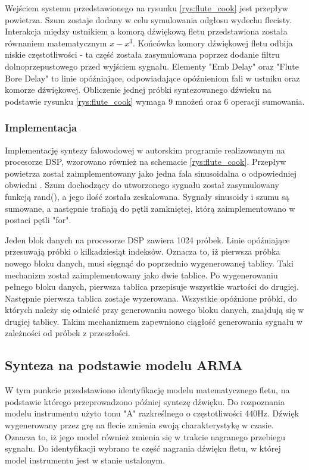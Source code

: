 Wejściem systemu przedstawionego na rysunku \ref{rys:flute_cook} jest przepływ powietrza. Szum zostaje dodany w celu symulowania odgłosu wydechu flecisty. 
Interakcja między ustnikiem a komorą dźwiękową fletu przedstawiona została równaniem matematycznym $x-x^3$. Końcówka komory dźwiękowej fletu odbija niskie częstotliwości - ta część została zasymulowana poprzez dodanie filtru dolnoprzepustowego przed wyjściem sygnału. Elementy "Emb Delay" oraz "Flute Bore Delay" to linie opóźniające, odpowiadające opóźnieniom fali w ustniku oraz komorze dźwiękowej. 
Obliczenie jednej próbki syntezowanego dźwieku na podstawie rysunku \ref{rys:flute_cook} wymaga 9 mnożeń oraz 6 operacji sumowania.

\subsubsection{Implementacja}
Implementację syntezy falowodowej w autorskim programie realizowanym na procesorze DSP,  wzorowano również na schemacie \ref{rys:flute_cook}. Przepływ powietrza został zaimplementowany jako jedna fala sinusoidalna o odpowiedniej obwiedni \cite{flute_prezka}. Szum dochodzący do utworzonego sygnału został zasymulowany funkcją rand(), a jego ilość została zeskalowana. Sygnały sinusoidy i szumu są sumowane, a następnie trafiają do pętli zamkniętej, którą zaimplementowano w postaci pętli "for".

Jeden blok danych na procesorze DSP zawiera 1024 próbek. Linie opóźniające przesuwają próbki o kilkadziesiąt indeksów. Oznacza to, iż pierwsza próbka nowego bloku danych, musi sięgnąć do poprzednio wygenerowanej tablicy. Taki mechanizm został zaimplementowany jako dwie tablice. Po wygenerowaniu pełnego bloku danych, pierwsza tablica przepisuje wszystkie wartości do drugiej. Następnie pierwsza tablica zostaje wyzerowana. Wszystkie opóźnione próbki, do których należy się odnieść przy generowaniu nowego bloku danych, znajdują się w drugiej tablicy. Takim mechanizmem zapewniono ciągłość generowania sygnału w zależności od próbek z przeszłości.

\subsection{Synteza na podstawie modelu ARMA}
W tym punkcie przedstawiono identyfikację modelu matematycznego fletu, na podstawie którego przeprowadzono później syntezę dźwięku. Do rozpoznania modelu instrumentu użyto tonu "A" razkreślnego o częstotliwości 440Hz. Dźwięk wygenerowany przez grę na flecie zmienia swoją charakterystykę w czasie. Oznacza to, iż jego model również zmienia się w trakcie nagranego przebiegu sygnału. Do identyfikacji wybrano te część nagrania dźwięku fletu, w której model instrumentu jest w stanie ustalonym.


